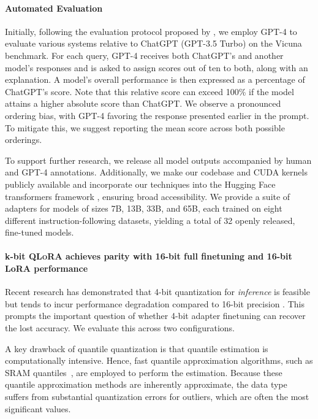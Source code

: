 \paragraph{Automated Evaluation} Initially, following the evaluation protocol proposed by \citet{vicuna2023}, we employ GPT-4 to evaluate various systems relative to ChatGPT (GPT-3.5 Turbo) on the Vicuna benchmark. For each query, GPT-4 receives both ChatGPT's and another model's responses and is asked to assign scores out of ten to both, along with an explanation. A model's overall performance is then expressed as a percentage of ChatGPT's score. Note that this relative score can exceed 100\% if the model attains a higher absolute score than ChatGPT. We observe a pronounced ordering bias, with GPT-4 favoring the response presented earlier in the prompt. To mitigate this, we suggest reporting the mean score across both possible orderings.



To support further research, we release all model outputs accompanied by human and GPT-4 annotations. Additionally, we make our codebase and CUDA kernels publicly available and incorporate our techniques into the Hugging Face transformers framework \citep{wolf2019huggingface}, ensuring broad accessibility. We provide a suite of adapters for models of sizes 7B, 13B, 33B, and 65B, each trained on eight different instruction-following datasets, yielding a total of 32 openly released, fine-tuned models.

\paragraph{k-bit \textsc{QLoRA} achieves parity with 16-bit full finetuning and 16-bit LoRA performance} Recent research has demonstrated that 4-bit quantization for \emph{inference} is feasible but tends to incur performance degradation compared to 16-bit precision \citep{dettmers2022case,frantar2022gptq}. This prompts the important question of whether 4-bit adapter finetuning can recover the lost accuracy. We evaluate this across two configurations.

A key drawback of quantile quantization is that quantile estimation is computationally intensive. Hence, fast quantile approximation algorithms, such as SRAM quantiles~\citep{dettmers2022optimizers}, are employed to perform the estimation. Because these quantile approximation methods are inherently approximate, the data type suffers from substantial quantization errors for outliers, which are often the most significant values.

